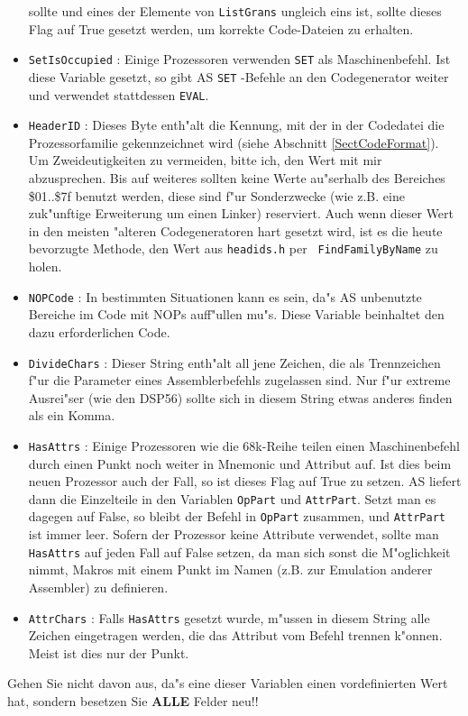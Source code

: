 \documentclass[12pt,a4paper,twoside]{report}
\newcommand{\bb}[1]{{\bf #1}}
\newcommand{\tty}[1]{{\tt #1}}
\begin{document}
\begin{itemize}
{      sollte und eines der Elemente von \tty{ListGrans} ungleich eins ist,
      sollte dieses Flag auf True gesetzt werden, um korrekte Code-Dateien
      zu erhalten.}
\item{\tty{SetIsOccupied} : Einige Prozessoren verwenden \tty{SET} als
      Maschinenbefehl.  Ist diese Variable gesetzt, so gibt AS \tty{SET}
      -Befehle an den Codegenerator weiter und verwendet stattdessen
      \tty{EVAL}.}
\item{\tty{HeaderID} : Dieses Byte enth"alt die Kennung, mit der in der Codedatei
      die Prozessorfamilie gekennzeichnet wird (siehe Abschnitt
      \ref{SectCodeFormat}).  Um Zweideutigkeiten zu vermeiden,
      bitte ich, den Wert mit mir abzusprechen.  Bis auf weiteres sollten
      keine Werte au"serhalb des Bereiches \$01..\$7f benutzt werden,
      diese sind f"ur Sonderzwecke (wie z.B. eine zuk"unftige Erweiterung
      um einen Linker) reserviert.  Auch wenn dieser Wert in den meisten
      "alteren Codegeneratoren hart gesetzt wird, ist es die heute
      bevorzugte Methode, den Wert aus {\tt headids.h} per {\tt
      FindFamilyByName} zu holen.}
\item{\tty{NOPCode} : In bestimmten Situationen kann es sein, da"s AS unbenutzte
      Bereiche im Code mit NOPs auff"ullen mu"s.  Diese Variable beinhaltet
      den dazu erforderlichen Code.}
\item{\tty{DivideChars} : Dieser String enth"alt all jene Zeichen, die als
      Trennzeichen f"ur die Parameter eines Assemblerbefehls zugelassen
      sind.  Nur f"ur extreme Ausrei"ser (wie den DSP56) sollte sich in
      diesem String etwas anderes finden als ein Komma.}
\item{\tty{HasAttrs} : Einige Prozessoren wie die 68k-Reihe teilen einen
      Maschinenbefehl durch einen Punkt noch weiter in Mnemonic und
      Attribut auf.  Ist dies beim neuen Prozessor auch der Fall, so
      ist dieses Flag auf True zu setzen.  AS liefert dann die Einzelteile
      in den Variablen \tty{OpPart} und \tty{AttrPart}.  Setzt man es
      dagegen auf False, so bleibt der Befehl in \tty{OpPart} zusammen,
      und \tty{AttrPart} ist immer leer.  Sofern der Prozessor keine
      Attribute verwendet, sollte man \tty{HasAttrs} auf jeden Fall auf False
      setzen, da man sich sonst die M"oglichkeit nimmt, Makros mit einem
      Punkt im Namen (z.B. zur Emulation anderer Assembler) zu definieren.}
\item{\tty{AttrChars} : Falls \tty{HasAttrs} gesetzt wurde, m"ussen in diesem
      String alle Zeichen eingetragen werden, die das Attribut vom Befehl
      trennen k"onnen.  Meist ist dies nur der Punkt.}
\end{itemize}
Gehen Sie nicht davon aus, da"s eine dieser Variablen einen vordefinierten
Wert hat, sondern besetzen Sie \bb{ALLE} Felder neu!!
\end{document}
